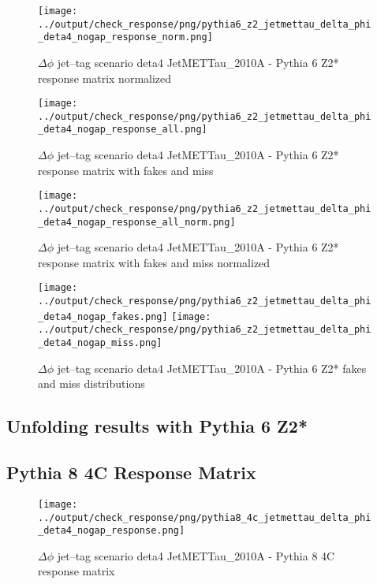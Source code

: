 \documentclass[11pt]{book}
\begin{document}
\begin{figure}[ht]
\centering
\texttt{[image: ../output/check\_response/png/pythia6\_z2\_jetmettau\_delta\_phi\_deta4\_nogap\_response\_norm.png]}
\caption{$\Delta\phi$ jet--tag scenario deta4 JetMETTau\_2010A - Pythia 6 Z2* response matrix normalized}
\label{p6_jetmettau_delta_phi_deta4_nogap_response_norm}
\end{figure}

\begin{figure}[ht]
\centering
\texttt{[image: ../output/check\_response/png/pythia6\_z2\_jetmettau\_delta\_phi\_deta4\_nogap\_response\_all.png]}
\caption{$\Delta\phi$ jet--tag scenario deta4 JetMETTau\_2010A - Pythia 6 Z2* response matrix with fakes and miss}
\label{p6_jetmettau_delta_phi_deta4_nogap_response_all}
\end{figure}

\begin{figure}[ht]
\centering
\texttt{[image: ../output/check\_response/png/pythia6\_z2\_jetmettau\_delta\_phi\_deta4\_nogap\_response\_all\_norm.png]}
\caption{$\Delta\phi$ jet--tag scenario deta4 JetMETTau\_2010A - Pythia 6 Z2* response matrix with fakes and miss normalized}
\label{p6_jetmettau_delta_phi_deta4_nogap_response_all_norm}
\end{figure}

\begin{figure}[ht]
\centering
\texttt{[image: ../output/check\_response/png/pythia6\_z2\_jetmettau\_delta\_phi\_deta4\_nogap\_fakes.png]}
\texttt{[image: ../output/check\_response/png/pythia6\_z2\_jetmettau\_delta\_phi\_deta4\_nogap\_miss.png]}
\caption{$\Delta\phi$ jet--tag scenario deta4 JetMETTau\_2010A - Pythia 6 Z2* fakes and miss distributions}
\label{p6_jetmettau_delta_phi_deta4_nogap_fakesmiss}
\end{figure}


\clearpage
\subsection{Unfolding results with Pythia 6 Z2*}


\clearpage
\subsection{Pythia 8 4C Response Matrix}


\begin{figure}[ht]
\centering
\texttt{[image: ../output/check\_response/png/pythia8\_4c\_jetmettau\_delta\_phi\_deta4\_nogap\_response.png]}
\caption{$\Delta\phi$ jet--tag scenario deta4 JetMETTau\_2010A - Pythia 8 4C response matrix}
\label{p8_jetmettau_delta_phi_deta4_nogap_response}
\end{figure}
\end{document}
